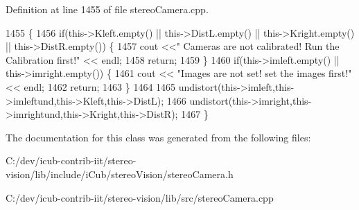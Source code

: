 Definition at line 1455 of file stereo\+Camera.\+cpp.


\begin{DoxyCode}
1455                                    \{
1456     \textcolor{keywordflow}{if}(this->Kleft.empty() || this->DistL.empty() || this->Kright.empty() || this->DistR.empty()) \{
1457         cout <<\textcolor{stringliteral}{" Cameras are not calibrated! Run the Calibration first!"} << endl;
1458         \textcolor{keywordflow}{return};
1459     \}
1460     \textcolor{keywordflow}{if}(this->imleft.empty() || this->imright.empty()) \{
1461         cout << \textcolor{stringliteral}{"Images are not set! set the images first!"} << endl;
1462         \textcolor{keywordflow}{return};
1463     \}
1464 
1465     undistort(this->imleft,this->imleftund,this->Kleft,this->DistL);
1466     undistort(this->imright,this->imrightund,this->Kright,this->DistR);
1467 \}
\end{DoxyCode}


The documentation for this class was generated from the following files\+:\begin{DoxyCompactItemize}
\item 
C\+:/dev/icub-\/contrib-\/iit/stereo-\/vision/lib/include/i\+Cub/stereo\+Vision/stereo\+Camera.\+h\item 
C\+:/dev/icub-\/contrib-\/iit/stereo-\/vision/lib/src/stereo\+Camera.\+cpp\end{DoxyCompactItemize}
